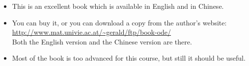 \documentclass[9pt]{beamer}
\begin{document}
\begin{frame}[t]
\begin{center}
 \end{center}

 \begin{itemize}
  \item<1-> This is an excellent book which is available in English and in Chinese.
  \item<2-> You can buy it, or you can download a copy from the author's website:
   \url{http://www.mat.univie.ac.at/~gerald/ftp/book-ode/}\\
   Both the English version and the Chinese version are there.
  \item<3-> Most of the book is too advanced for this course, but still it should be useful.
 \end{itemize}
\end{frame}
\end{document}
